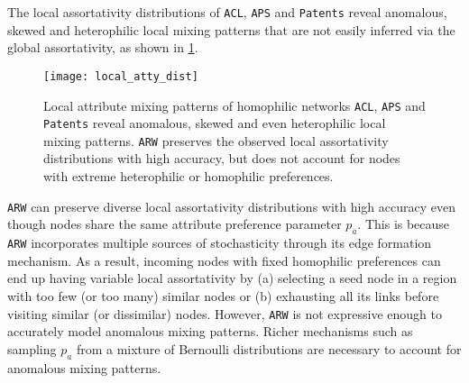 The local assortativity distributions
of \texttt{ACL}, \texttt{APS} and \texttt{Patents} reveal anomalous, skewed
and heterophilic local mixing patterns that are not easily inferred via the global assortativity,
as shown in \cref{fig:local_atty}.
\begin{figure}
    \centering
    \texttt{[image: local\_atty\_dist]}
    \caption{Local attribute mixing patterns of homophilic networks \texttt{ACL}, \texttt{APS}
    and \texttt{Patents} reveal anomalous, skewed and even heterophilic local mixing patterns.
    \texttt{ARW} preserves the observed local assortativity distributions with high accuracy,
    but does not account for nodes with extreme heterophilic or homophilic preferences.}
    \label{fig:local_atty}
\end{figure}
\texttt{ARW} can preserve
diverse local assortativity distributions with high accuracy even though nodes
share the same attribute preference parameter $p_a$. This is because  \texttt{ARW}
incorporates multiple sources of stochasticity through its edge formation
mechanism. As a result, incoming nodes with fixed homophilic preferences can end
up having variable local assortativity by (a) selecting a seed node in a region
with too few (or too many) similar nodes or (b) exhausting all its links before
visiting similar (or dissimilar) nodes.
However, \texttt{ARW} is not expressive enough to accurately model anomalous
mixing patterns. Richer mechanisms such as sampling $p_a$ from a mixture of
Bernoulli distributions are necessary to account for anomalous mixing patterns.



%
%


























